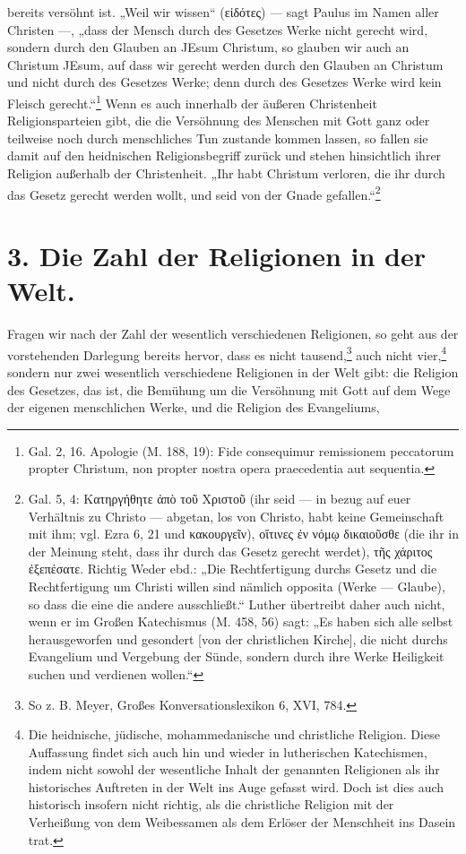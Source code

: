 bereits versöhnt ist. „Weil wir wissen“ (εἰδότες) — sagt Paulus im Namen aller Christen —, „dass der Mensch durch des Gesetzes Werke nicht gerecht wird, sondern durch den Glauben an JEsum Christum, so glauben wir auch an Christum JEsum, auf dass wir gerecht werden durch den Glauben an Christum und nicht durch des Gesetzes Werke; denn durch des Gesetzes Werke wird kein Fleisch gerecht.“\footnote{Gal. 2, 16. Apologie (M. 188, 19): Fide consequimur remissionem peccatorum propter Christum, non propter nostra opera praecedentia aut sequentia.} Wenn es auch innerhalb der äußeren Christenheit Religionsparteien gibt, die die Versöhnung des Menschen mit Gott ganz oder teilweise noch durch menschliches Tun zustande kommen lassen, so fallen sie damit auf den heidnischen Religionsbegriff zurück und stehen hinsichtlich ihrer Religion außerhalb der Christenheit. „Ihr habt Christum verloren, die ihr durch das Gesetz gerecht werden wollt, und seid von der Gnade gefallen.“\footnote{Gal. 5, 4: Κατηργήθητε ἀπὸ τοῦ Χριστοῦ (ihr seid — in bezug auf euer Verhältnis zu Christo — abgetan, los von Christo, habt keine Gemeinschaft mit ihm; vgl. Ezra 6, 21 und κακουργεῖν), οἵτινες ἐν νόμῳ δικαιοῦσθε (die ihr in der Meinung steht, dass ihr durch das Gesetz gerecht werdet), τῆς χάριτος ἐξεπέσατε. Richtig Weder ebd.: „Die Rechtfertigung durchs Gesetz und die Rechtfertigung um Christi willen sind nämlich opposita (Werke — Glaube), so dass die eine die andere ausschließt.“ Luther übertreibt daher auch nicht, wenn er im Großen Katechismus (M. 458, 56) sagt: „Es haben sich alle selbst herausgeworfen und gesondert [von der christlichen Kirche], die nicht durchs Evangelium und Vergebung der Sünde, sondern durch ihre Werke Heiligkeit suchen und verdienen wollen.“}

\section*{3. Die Zahl der Religionen in der Welt.}

Fragen wir nach der Zahl der wesentlich verschiedenen Religionen, so geht aus der vorstehenden Darlegung bereits hervor, dass es nicht tausend,\footnote{So z. B. Meyer, Großes Konversationslexikon 6, XVI, 784.} auch nicht vier,\footnote{Die heidnische, jüdische, mohammedanische und christliche Religion. Diese Auffassung findet sich auch hin und wieder in lutherischen Katechismen, indem nicht sowohl der wesentliche Inhalt der genannten Religionen als ihr historisches Auftreten in der Welt ins Auge gefasst wird. Doch ist dies auch historisch insofern nicht richtig, als die christliche Religion mit der Verheißung von dem Weibessamen als dem Erlöser der Menschheit ins Dasein trat.} sondern nur zwei wesentlich verschiedene Religionen in der Welt gibt: die Religion des Gesetzes, das ist, die Bemühung um die Versöhnung mit Gott auf dem Wege der eigenen menschlichen Werke, und die Religion des Evangeliums,